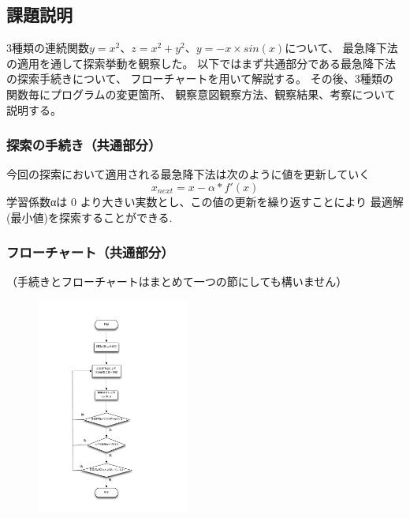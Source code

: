 \subsection{課題説明}
3種類の連続関数$y=x^2$、$z=x^2+y^2$、$y=-x \times sin(x)$について、
最急降下法の適用を通して探索挙動を観察した。
以下ではまず共通部分である最急降下法の探索手続きについて、
フローチャートを用いて解説する。
その後、3種類の関数毎にプログラムの変更箇所、
観察意図観察方法、観察結果、考察について説明する。

\subsubsection{探索の手続き（共通部分）}
今回の探索において適用される最急降下法は次のように値を更新していく
\[x_{next} = x -α*f'(x)\]
学習係数αは 0 より大きい実数とし、この値の更新を繰り返すことにより
最適解(最小値)を探索することができる.

\subsubsection{フローチャート（共通部分）}
（手続きとフローチャートはまとめて一つの節にしても構いません）
	\begin{figure}[h!]
  		\includegraphics[clip,width=5.0cm]{flowchart.pdf}
	\end{figure}

